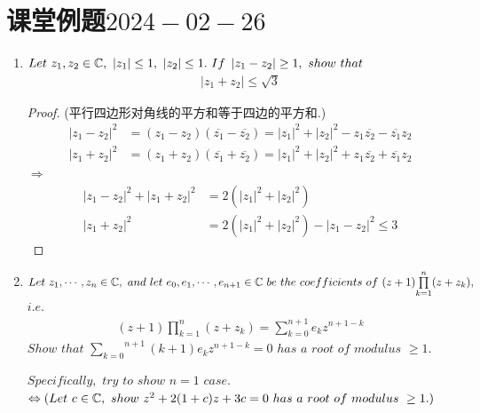 \section{课堂例题$2024-02-26$}
	\begin{enumerate}
		\item $Let \,\, z_1 , z_2 \in \mathbb{C} , \,\, \left| z_1 \right| \leq 1 , \,\, \left| z_2 \right| \leq 1 . \,\, If \,\, \left| z_1 - z_2 \right| \geq 1 , \,\, show \,\, that$
		\begin{align}
			\left| z_1 + z_2 \right| \leq \sqrt{3}
		\end{align}
	
	\vspace*{2em}
	\begin{proof}
		(平行四边形对角线的平方和等于四边的平方和.)
		\begin{align}
			\left| z_1 - z_2 \right|^2 
			&= (z_1 - z_2)(\overline{z_1} - \overline{z_2})
			= \left| z_1 \right|^2 + \left| z_2 \right|^2 - z_1 \overline{z_2} - \overline{z_1} z_2\\
			\left| z_1 + z_2 \right|^2 
			&= (z_1 + z_2)(\overline{z_1} + \overline{z_2})
			= \left| z_1 \right|^2 + \left| z_2 \right|^2 + z_1 \overline{z_2} + \overline{z_1} z_2
		\end{align}
		$\Rightarrow$
		\begin{align}
			\left| z_1 - z_2 \right|^2 + \left| z_1 + z_2 \right|^2 
			&= 2(\left| z_1 \right|^2 + \left| z_2 \right|^2) \\
			\left| z_1 + z_2 \right|^2 
			&= 2(\left| z_1 \right|^2 + \left| z_2 \right|^2) - \left| z_1 - z_2 \right|^2 
			\leq 3
		\end{align}
	\end{proof}

	\vspace*{3em}

	\item $Let \,\, z_1 , \cdots , z_n \in \mathbb{C} , \,\, and \,\, let \,\, e_0 , e_1 , \cdots , e_{n + 1} \in \mathbb{C} \,\, be \,\, the \,\, coefficients \,\, of \,\, (z + 1) \overset{n}{\underset{k = 1}{\prod}}{(z + z_k)} , $\\
	$i.e.$
	\begin{align}
		(z + 1) \prod_{k = 1}^{n}{(z + z_k)} = \sum_{k = 0}^{n + 1}{e_k z^{n + 1 - k}}
	\end{align}
	$Show \,\, that \,\, \overset{n + 1}{\underset{k = 0}{\sum}}{(k + 1) e_k z^{n + 1 - k}} = 0 \,\, has \,\, a \,\, root \,\, of \,\, modulus \,\, \geq 1 .$
	
	\vspace*{2em}
	$Specifically , \,\, try \,\, to \,\, show \,\, n = 1 \,\, case . $\\
	$\Leftrightarrow (Let \,\, c \in \mathbb{C} , \,\, show \,\, z^2 + 2(1 + c)z + 3c = 0 \,\, has \,\, a \,\, root \,\, of \,\, modulus \,\, \geq 1 .)$
	

\end{enumerate}
